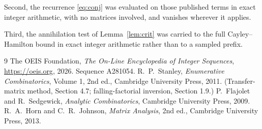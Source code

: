 \documentclass[11pt,a4paper]{article}
\theoremstyle{plain}
\theoremstyle{definition}
\begin{document}
Second, the recurrence \eqref{eq:conj} was evaluated on those published terms in exact
integer arithmetic, with no matrices involved, and vanishes wherever it applies.

Third, the annihilation test of Lemma~\ref{lem:crit} was carried to the full
Cayley--Hamilton bound in exact integer arithmetic rather than to a sampled prefix.

\begin{thebibliography}{9}
 The OEIS Foundation, \emph{The On-Line Encyclopedia of Integer
Sequences}, \url{https://oeis.org}, 2026. Sequence A281054.
 R.~P.~Stanley, \emph{Enumerative Combinatorics}, Volume 1, 2nd ed.,
Cambridge University Press, 2011. (Transfer-matrix method, Section 4.7; falling-factorial
inversion, Section 1.9.)
 P.~Flajolet and R.~Sedgewick, \emph{Analytic Combinatorics}, Cambridge
University Press, 2009.
 R.~A.~Horn and C.~R.~Johnson, \emph{Matrix Analysis}, 2nd ed., Cambridge
University Press, 2013.
\end{thebibliography}
\end{document}

